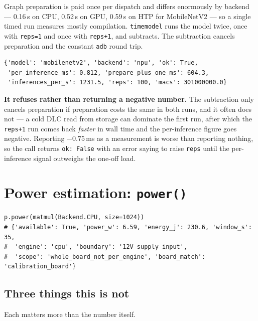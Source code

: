 \documentclass[11pt,a4paper]{article}
\newcommand{\code}[1]{\texttt{\let\_\breakableunderscore #1}}
\newcommand{\breakableunderscore}{\textunderscore\allowbreak}
\begin{document}
Graph preparation is paid once per dispatch and differs enormously by backend
--- 0.16\,s on CPU, 0.52\,s on GPU, 0.59\,s on HTP for MobileNetV2 --- so a
single timed run measures mostly compilation. \code{time\_model} runs the model
twice, once with \code{reps=1} and once with \code{reps+1}, and subtracts. The
subtraction cancels preparation and the constant \code{adb} round trip.

\begin{lstlisting}
{'model': 'mobilenetv2', 'backend': 'npu', 'ok': True,
 'per_inference_ms': 0.812, 'prepare_plus_one_ms': 604.3,
 'inferences_per_s': 1231.5, 'reps': 100, 'macs': 301000000.0}
\end{lstlisting}

\noindent \textbf{It refuses rather than returning a negative number.} The
subtraction only cancels preparation if preparation costs the same in both
runs, and it often does not --- a cold DLC read from storage can dominate the
first run, after which the \code{reps+1} run comes back \emph{faster} in wall
time and the per-inference figure goes negative. Reporting $-0.75$\,ms as a
measurement is worse than reporting nothing, so the call returns
\code{ok: False} with an error saying to raise \code{reps} until the
per-inference signal outweighs the one-off load.

\section{Power estimation: \texttt{power()}}
\label{sec:power}

\begin{lstlisting}
p.power(matmul(Backend.CPU, size=1024))
# {'available': True, 'power_w': 6.59, 'energy_j': 230.6, 'window_s': 35,
#  'engine': 'cpu', 'boundary': '12V supply input',
#  'scope': 'whole_board_not_per_engine', 'board_match': 'calibration_board'}
\end{lstlisting}

\subsection{Three things this is not}

Each matters more than the number itself.
\end{document}
